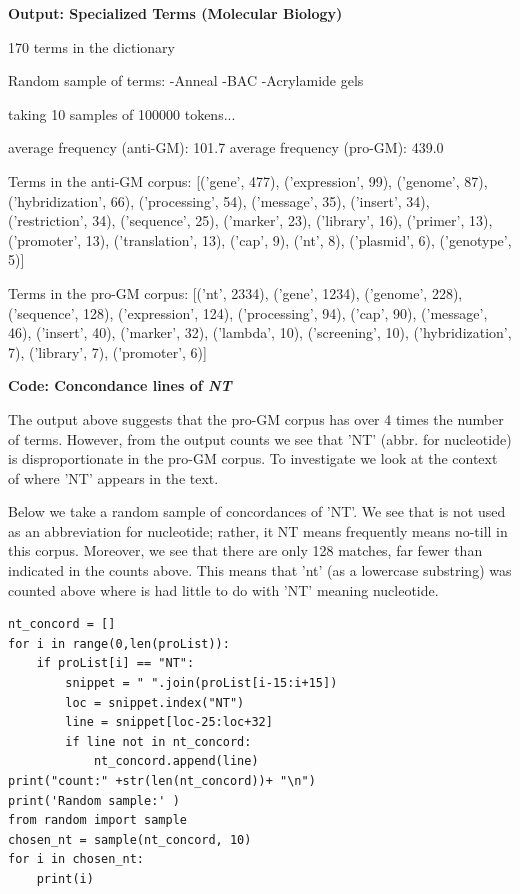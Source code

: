 \textbf{Output: Specialized Terms (Molecular Biology)}
\begin{footnotesize}

170 terms in the dictionary

Random sample of terms:\newline
-Anneal\newline
-BAC\newline
-Acrylamide gels

taking 10 samples of 100000 tokens...

average frequency (anti-GM): 101.7\newline
average frequency (pro-GM): 439.0

Terms in the anti-GM corpus:
[('gene', 477), ('expression', 99), ('genome', 87), ('hybridization', 66), ('processing', 54), ('message', 35), ('insert', 34), ('restriction', 34), ('sequence', 25), ('marker', 23), ('library', 16), ('primer', 13), ('promoter', 13), ('translation', 13), ('cap', 9), ('nt', 8), ('plasmid', 6), ('genotype', 5)]

Terms in the pro-GM corpus:
[('nt', 2334), ('gene', 1234), ('genome', 228), ('sequence', 128), ('expression', 124), ('processing', 94), ('cap', 90), ('message', 46), ('insert', 40), ('marker', 32), ('lambda', 10), ('screening', 10), ('hybridization', 7), ('library', 7), ('promoter', 6)]
\end{footnotesize}

\textbf{Code: Concondance lines of \textit{NT}}

The output above suggests that the pro-GM corpus has over 4 times the number of terms. However, from the output counts we see that 'NT' (abbr. for nucleotide) is disproportionate in the pro-GM corpus. To investigate we look at the context of where 'NT' appears in the text.

Below we take a random sample of concordances of 'NT'. We see that is not used as an abbreviation for nucleotide; rather, it NT means frequently means no-till in this corpus. Moreover, we see that there are only 128 matches, far fewer than indicated in the counts above. This means that 'nt' (as a lowercase substring) was counted above where is had little to do with 'NT' meaning nucleotide.
\newline
\begin{lstlisting}
nt_concord = []
for i in range(0,len(proList)):
    if proList[i] == "NT":
        snippet = " ".join(proList[i-15:i+15])
        loc = snippet.index("NT")
        line = snippet[loc-25:loc+32]
        if line not in nt_concord:
            nt_concord.append(line)
print("count:" +str(len(nt_concord))+ "\n")
print('Random sample:' ) 
from random import sample
chosen_nt = sample(nt_concord, 10)
for i in chosen_nt:
    print(i)
\end{lstlisting}

